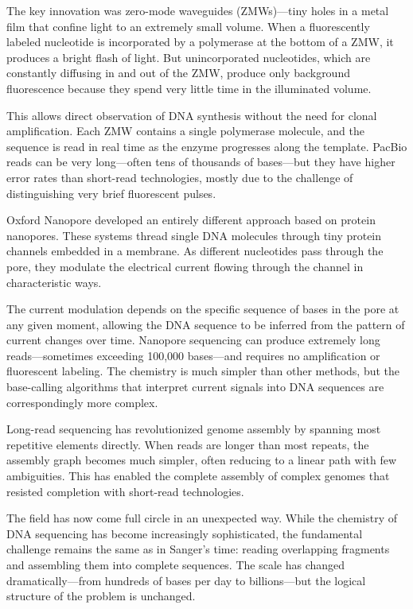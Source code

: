 The key innovation was zero-mode waveguides (ZMWs)—tiny holes in a metal film that confine light to an extremely small volume. When a fluorescently labeled nucleotide is incorporated by a polymerase at the bottom of a ZMW, it produces a bright flash of light. But unincorporated nucleotides, which are constantly diffusing in and out of the ZMW, produce only background fluorescence because they spend very little time in the illuminated volume.

This allows direct observation of DNA synthesis without the need for clonal amplification. Each ZMW contains a single polymerase molecule, and the sequence is read in real time as the enzyme progresses along the template. PacBio reads can be very long—often tens of thousands of bases—but they have higher error rates than short-read technologies, mostly due to the challenge of distinguishing very brief fluorescent pulses.

Oxford Nanopore developed an entirely different approach based on protein nanopores. These systems thread single DNA molecules through tiny protein channels embedded in a membrane. As different nucleotides pass through the pore, they modulate the electrical current flowing through the channel in characteristic ways.

The current modulation depends on the specific sequence of bases in the pore at any given moment, allowing the DNA sequence to be inferred from the pattern of current changes over time. Nanopore sequencing can produce extremely long reads—sometimes exceeding 100,000 bases—and requires no amplification or fluorescent labeling. The chemistry is much simpler than other methods, but the base-calling algorithms that interpret current signals into DNA sequences are correspondingly more complex.

Long-read sequencing has revolutionized genome assembly by spanning most repetitive elements directly. When reads are longer than most repeats, the assembly graph becomes much simpler, often reducing to a linear path with few ambiguities. This has enabled the complete assembly of complex genomes that resisted completion with short-read technologies.

The field has now come full circle in an unexpected way. While the chemistry of DNA sequencing has become increasingly sophisticated, the fundamental challenge remains the same as in Sanger's time: reading overlapping fragments and assembling them into complete sequences. The scale has changed dramatically—from hundreds of bases per day to billions—but the logical structure of the problem is unchanged.

